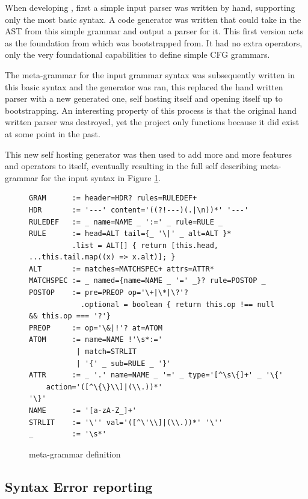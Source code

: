 When developing \tsPEG{}, first a simple input parser was written by hand, supporting only the most basic syntax. A code generator was written that could take in the AST from this simple grammar and output a parser for it. This first version acts as the foundation from which \tsPEG{} was bootstrapped from. It had no extra operators, only the very foundational capabilities to define simple CFG grammars.

The meta-grammar for the input grammar syntax was subsequently written in this basic syntax and the generator was ran, this replaced the hand written parser with a new generated one, self hosting itself and opening itself up to bootstrapping. An interesting property of this process is that the original hand written parser was destroyed, yet the project only functions because it did exist at some point in the past.

This new self hosting generator was then used to add more and more features and operators to itself, eventually resulting in the full self describing meta-grammar for the \tsPEG{} input syntax in Figure \ref{tspegsyntax}.

\begin{figure}
    \caption{\tsPEG{} meta-grammar definition}
    \label{tspegsyntax}
    \begin{lstlisting}
GRAM      := header=HDR? rules=RULEDEF+
HDR       := '---' content='((?!---)(.|\n))*' '---'
RULEDEF   := _ name=NAME _ ':=' _ rule=RULE _
RULE      := head=ALT tail={_ '\|' _ alt=ALT }*
          .list = ALT[] { return [this.head, ...this.tail.map((x) => x.alt)]; }
ALT       := matches=MATCHSPEC+ attrs=ATTR*
MATCHSPEC := _ named={name=NAME _ '=' _}? rule=POSTOP _
POSTOP    := pre=PREOP op='\+|\*|\?'?
            .optional = boolean { return this.op !== null && this.op === '?'}
PREOP     := op='\&|!'? at=ATOM
ATOM      := name=NAME !'\s*:='
           | match=STRLIT
           | '{' _ sub=RULE _ '}'
ATTR      := _ '.' name=NAME _ '=' _ type='[^\s\{]+' _ '\{'
    action='([^\{\}\\]|(\\.))*'
'\}'
NAME      := '[a-zA-Z_]+'
STRLIT    := '\'' val='([^\'\\]|(\\.))*' '\''
_         := '\s*'
    \end{lstlisting}
\end{figure}

\subsection{Syntax Error reporting}

